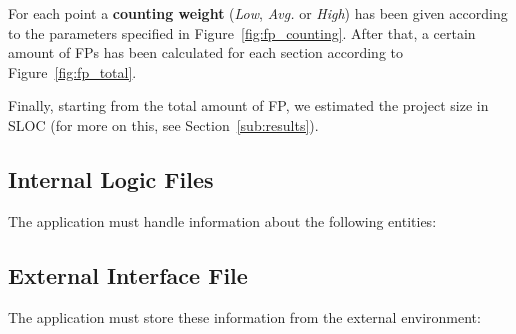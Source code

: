 For each point a \textbf{counting weight} (\emph{Low}, \emph{Avg.} or \emph{High}) has been given according to the parameters specified in Figure~\ref{fig:fp_counting}. After that, a certain amount of FPs has been calculated for each section according to Figure~\ref{fig:fp_total}.

Finally, starting from the total amount of FP, we estimated the project size in SLOC (for more on this, see Section~\ref{sub:results}).

\subsection{Internal Logic Files} %
\label{sub:ilf}
The application must handle information about the following entities:

\begin{table}[h]
    \label{tab:ilf}
    \centering
\end{table}

\subsection{External Interface File} %
\label{sub:eif}
The application must store these information from the external environment:

